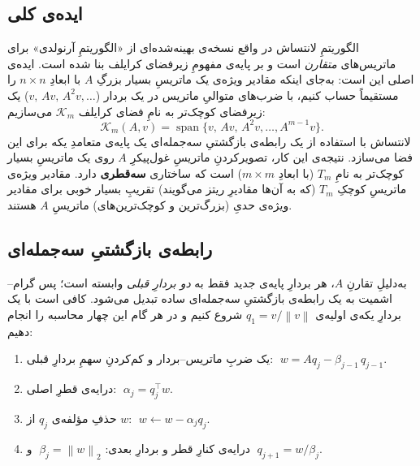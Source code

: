\documentclass[14pt]{extarticle}
\newcommand{\norm}[1]{\left\lVert #1 \right\rVert}
\newcommand{\T}{^{\top}}
\begin{document}
\subsection{ایده‌ی کلی}

الگوریتمِ لانتساش در واقع نسخه‌ی بهینه‌شده‌ای از «الگوریتمِ آرنولدی» برای ماتریس‌های \emph{متقارن} است و بر پایه‌ی مفهومِ زیرفضای کرایلف بنا شده است. ایده‌ی اصلی این است: به‌جای اینکه مقادیر ویژه‌ی یک ماتریسِ بسیار بزرگِ $A$ با ابعادِ $n\times n$ را مستقیماً حساب کنیم، با ضرب‌های متوالیِ ماتریس در یک بردار ($v,\,Av,\,A^2v,\dots$) یک زیرفضای کوچک‌تر به نامِ فضای کرایلف $\mathcal K_m$ می‌سازیم:
\[
\mathcal{K}_m(A,v)=\operatorname{span}\{v,\,Av,\,A^2v,\dots,A^{m-1}v\}.
\]
لانتساش با استفاده از یک رابطه‌ی بازگشتیِ سه‌جمله‌ای یک پایه‌ی متعامدِ یکه برای این فضا می‌سازد. نتیجه‌ی این کار، تصویرکردنِ ماتریسِ غول‌پیکرِ $A$ روی یک ماتریسِ بسیار کوچک‌تر به نامِ $T_m$ (با ابعادِ $m\times m$) است که ساختاری \textbf{سه‌قطری} دارد. مقادیر ویژه‌ی ماتریسِ کوچکِ $T_m$ (که به آن‌ها مقادیرِ ریتز می‌گویند) تقریبِ بسیار خوبی برای مقادیر ویژه‌ی حدیِ (بزرگ‌ترین و کوچک‌ترین‌های) ماتریسِ $A$ هستند.

\subsection{رابطه‌ی بازگشتیِ سه‌جمله‌ای}

به‌دلیلِ تقارنِ $A$، هر بردارِ پایه‌ی جدید فقط به \emph{دو بردارِ قبلی} وابسته است؛ پس گرام--اشمیت به یک رابطه‌ی بازگشتیِ سه‌جمله‌ای ساده تبدیل می‌شود. کافی است با یک بردارِ یکه‌ی اولیه‌ی $q_1=v/\norm{v}$ شروع کنیم و در هر گام این چهار محاسبه را انجام دهیم:

\begin{enumerate}[leftmargin=1.8em,itemsep=2pt,topsep=3pt]
\item یک ضربِ ماتریس--بردار و کم‌کردنِ سهمِ بردارِ قبلی: $\;w = A q_j - \beta_{j-1}\,q_{j-1}$.
\item درایه‌ی قطرِ اصلی: $\;\alpha_j = q_j\T w$.
\item حذفِ مؤلفه‌ی $q_j$ از $w$: $\;w \leftarrow w - \alpha_j q_j$.
\item درایه‌ی کنارِ قطر و بردارِ بعدی: $\;\beta_j = \norm{w}_2$ و $\;q_{j+1} = w/\beta_j$.
\end{enumerate}
\end{document}

